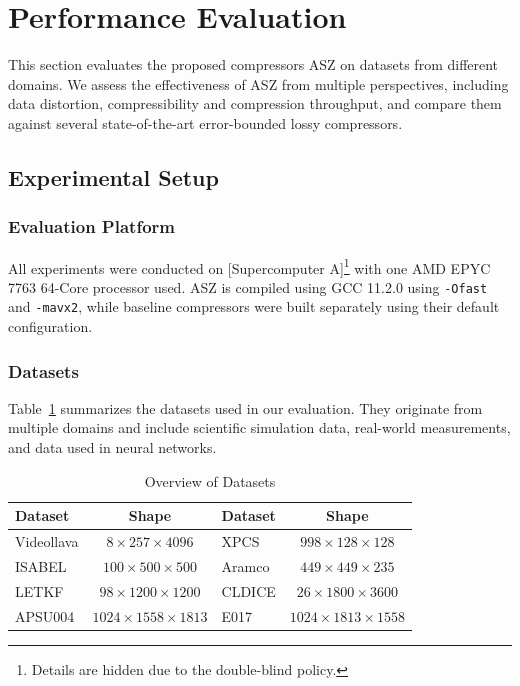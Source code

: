 
\section{Performance Evaluation}\label{sec:performance}

This section evaluates the proposed compressors ASZ on datasets from different domains. We assess the effectiveness of ASZ from multiple perspectives, including data distortion, compressibility and compression throughput, and compare them against several state-of-the-art error-bounded lossy compressors.

\subsection{Experimental Setup}\label{sec:performance:setup}

\subsubsection{Evaluation Platform}
All experiments were conducted on [Supercomputer A]\footnote{Details are hidden due to the double-blind policy.} with one AMD EPYC 7763 64-Core processor used.
ASZ is compiled using GCC 11.2.0 using \verb|-Ofast| and \verb|-mavx2|, while baseline compressors were built separately using their default configuration.

\subsubsection{Datasets}

Table~\ref{tab:datasets} summarizes the datasets used in our evaluation. They originate from multiple domains and include scientific simulation data, real-world measurements, and data used in neural networks.

\begin{table}[htb]
    \centering
    \caption{Overview of Datasets}
    \label{tab:datasets}
    \setlength{\tabcolsep}{4pt}
    \begin{tabular}{lc|lc}
        \toprule
        Dataset    & Shape                      & Dataset & Shape \\
        \midrule
        Videollava & $8\times257\times4096$     & XPCS    & $998\times128\times128$ \\
        ISABEL     & $100\times500\times500$    & Aramco  & $449\times449\times235$ \\
        LETKF      & $98\times1200\times1200$   & CLDICE  & $26\times1800\times3600$ \\
        APSU004    & $1024\times1558\times1813$ & E017    & $1024\times1813\times1558$ \\
        \bottomrule
    \end{tabular}
\end{table}

